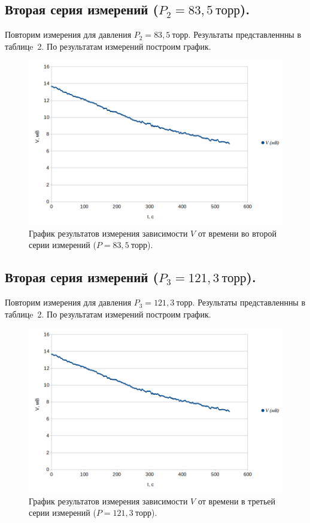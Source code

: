 \documentclass[a4paper,11pt]{article}
\begin{document}
\subsection{Вторая серия измерений ($P_{2} = 83,5\ торр$).}
Повторим измерения для давления $P_{2} = 83,5\ торр$. Результаты представленнны в таблицe~2.
По результатам измерений построим график.
\begin{figure}[h!]\label{fig:img4}
  \centering
  \includegraphics[scale = 0.4125]{graph2.png}
  \caption{График результатов измерения зависимости $V$ от времени во второй серии измерений ($P = 83,5\ торр$).}
\end{figure}
\subsection{Вторая серия измерений ($P_{3} = 121,3\ торр$).}
Повторим измерения для давления $P_{3} = 121,3\ торр$. Результаты представленнны в таблицe~2.
По результатам измерений построим график.
\begin{figure}[h!]\label{fig:img4}
  \centering
  \includegraphics[scale = 0.4125]{graph2.png}
  \caption{График результатов измерения зависимости $V$ от времени в третьей серии измерений ($P = 121,3\ торр$).}
\end{figure}
\end{document}
